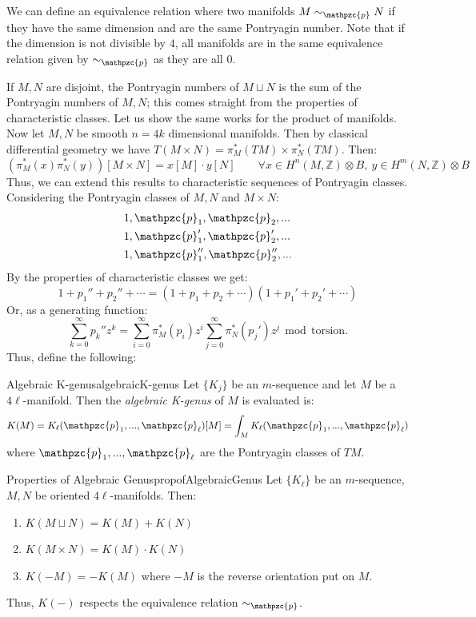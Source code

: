 \documentclass{ut-thesis}
\newcommand{\Z}{{\mathbb{Z}}}
\newcommand{\cp}{{\mathpzc{p}}}
\renewcommand{\mod}{\,\operatorname{mod}\,}
\newcommand{\dcup}{\sqcup}
\begin{document}
We can define an equivalence relation where two manifolds $M\sim_\cp N$ if they have the same dimension and
are the same Pontryagin number. Note that if the dimension is not divisible by $4$, all manifolds are in the
same equivalence relation given by $\sim_\cp$ as they are all $0$.

If $M, N$ are disjoint, the Pontryagin numbers of $M\dcup N$ is the sum of the Pontryagin numbers of $M,N$;
this comes straight from the properties of characteristic classes. Let us show the same works for the product
of manifolds. Now let $M,N$ be smooth $n =4k$ dimensional manifolds. Then by classical differential geometry we have
$T(M\times N) = \pi_M^*(TM)\times \pi_N^*(TM)$. Then:
\[
  (\pi_M^*(x)\pi_N^*(y))[M\times N] = x[M]\cdot y[N] \qquad \forall x \in H^n(M,\Z)\otimes B,\ y \in H^m(N,\Z)\otimes B
\]
Thus, we can extend this results to characteristic sequences of Pontryagin classes.
Considering the Pontryagin classes of $M,N$ and $M\times N$:
\begin{align*}
  &1, \cp_1, \cp_2, ...\\
  &1, \cp_1', \cp_2', ...\\
  &1, \cp_1'', \cp_2'', ...\\
\end{align*}
By the properties of characteristic classes we get:
\[
  1 + p_1'' + p_2'' + \cdots = (1 + p_1 + p_2 + \cdots)(1 + p_1' + p_2' + \cdots)
\]
Or, as a generating function:
\[
  \sum_{k=0}^\infty p_k'' z^k = \sum_{i=0}^\infty \pi_M^*(p_i) z^i \sum_{j=0}^\infty \pi_N^*(p_j') z^j \mod \text{torsion}.
\]
Thus, define the following:
\begin{defn}{Algebraic K-genus}{algebraicK-genus}
  Let $\{K_j\}$ be an $m$-sequence and let $M$ be a $4\ell$-manifold. Then the \emph{algebraic K-genus} of
  $M$ is evaluated is:
  \[
    K(M) = K_\ell(\cp_1, ..., \cp_\ell)[M] = \int_M K_\ell(\cp_1, ..., \cp_\ell)
  \]
  where $\cp_1, ..., \cp_\ell$ are the Pontryagin classes of $TM$.
\end{defn}

\begin{prop}{Properties of Algebraic Genus}{propofAlgebraicGenus}
  Let $\{K_\ell\}$ be an $m$-sequence, $M,N$ be oriented $4\ell$-manifolds. Then:
  \begin{enumerate}
    \item $K(M\dcup N) = K(M)+K(N)$
    \item $K(M\times N) = K(M)\cdot K(N)$
    \item $K(-M) = -K(M)$ where $-M$ is the reverse orientation put on $M$.
  \end{enumerate}
  Thus, $K(-)$ respects the equivalence relation $\sim_\cp$.
\end{prop}
\end{document}
